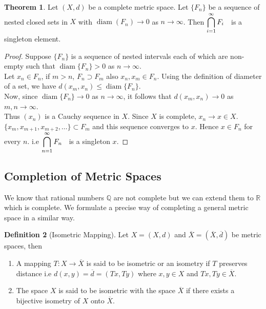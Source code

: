 \documentclass[11pt,a4paper]{article}
\theoremstyle{definition}
\newtheorem{thm}{Theorem}[section]
\newtheorem{defn}[thm]{Definition}
\DeclareMathOperator{\diam}{diam}
\begin{document}
\begin{thm}
Let $(X,d)$ be a complete metric space. Let $\{F_n\}$ be a sequence of nested closed sets in $X$ with $\diam(F_n)\rightarrow 0$ as $n\rightarrow \infty$. Then \hspace{0.2cm}$\displaystyle{\bigcap^{\infty}_{i=1}F_i} \hspace{0.2cm}$ is a singleton element.

\end{thm}

\begin{proof}
Suppose $\{F_n\}$ is a sequence of nested intervals each of which are non-empty such that $\diam\{F_n\}>0$ as $n\rightarrow \infty$.\\ Let $x_n\in F_n$, if $m>n$, $F_n\supset F_m$ also $x_n,x_m\in F_n$. Using the definition of diameter of a set, we have $d(x_m,x_n)\leq \diam\{F_n\}$.\\ Now, since $\diam\{F_n\}\rightarrow 0$ as $n\rightarrow \infty$, it follows that $d(x_m,x_n)\rightarrow 0$ as $m,n\rightarrow \infty$.\\ Thus $(x_n)$ is a Cauchy sequence in $X$. Since $X$ is complete, $x_n\rightarrow x\in X$.\\ $\{x_m,x_{m+1},x_{m+2},\dots\}\subset F_m$ and this sequence converges to $x$. Hence $x\in F_n$ for every $n$. i.e \hspace{0.2cm}$\displaystyle{\bigcap^{\infty}_{n=1}F_n}\hspace{0.2cm}$ is a singleton $x$.
\end{proof}


\pagebreak
\pagebreak

\subsection{Completion of Metric Spaces}
We know that rational numbers $\mathbb{Q}$ are not complete but we can extend them to $\mathbb{R}$ which is complete. We formulate a precise way of completing a general metric space in a similar way.

\begin{defn}[Isometric Mapping]
Let $X=(X,d)$ and $\overline{X}=(\overline{X},\overline{d})$ be metric spaces, then
\begin{enumerate}
\item[a] A mapping $T:X\rightarrow \overline{X}$ is said to be isometric or an isometry if $T$ preserves distance i.e $d(x,y)=\overline{d}=(Tx,Ty)$ where $x,y\in X$ and $Tx,Ty\in \overline{X}$.
\item[b] The space $X$ is said to be isometric with the space $\overline{X}$ if there exists a bijective isometry of $X$ onto $\overline{X}$.
\end{enumerate}
\end{defn}
\end{document}
